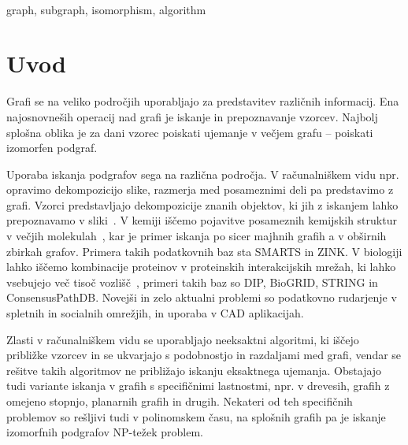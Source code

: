 \documentclass[a4paper, 12pt, ]{book}
\newcommand{\clearemptydoublepage}{\newpage{\pagestyle{empty}\cleardoublepage}}
\begin{document}
	\vspace{2cm}
	\\
	graph, subgraph, isomorphism, algorithm
	
	\clearemptydoublepage




\mainmatter
\setcounter{page}{1}
\pagestyle{fancy}



\chapter{Uvod}
Grafi se na veliko področjih uporabljajo za predstavitev različnih informacij. Ena najosnovneših 
operacij nad grafi je iskanje in prepoznavanje vzorcev. Najbolj splošna oblika je za dani vzorec poiskati
ujemanje v večjem grafu -- poiskati izomorfen podgraf. 

Uporaba iskanja podgrafov sega na različna področja. V računalniškem vidu npr. opravimo 
dekompozicijo slike, razmerja med posameznimi deli pa predstavimo z grafi. Vzorci predstavljajo
dekompozicije znanih objektov, ki jih z iskanjem lahko prepoznavamo v sliki~\cite{vf2}. V kemiji iščemo
pojavitve posameznih kemijskih struktur v večjih molekulah~\cite{chem}, kar je primer iskanja po sicer
majhnih grafih a v obširnih zbirkah grafov. Primera takih podatkovnih baz sta SMARTS in ZINK. V
biologiji lahko iščemo kombinacije proteinov v proteinskih interakcijskih mrežah, ki lahko vsebujejo več
tisoč vozlišč~\cite{subsea}, primeri takih baz so DIP, BioGRID, STRING in ConsensusPathDB. Novejši
in zelo aktualni problemi so podatkovno rudarjenje v spletnih in socialnih omrežjih, in uporaba v CAD
aplikacijah.

Zlasti v računalniškem vidu se uporabljajo neeksaktni algoritmi, ki iščejo približke vzorcev in se ukvarjajo
s podobnostjo in razdaljami med grafi, vendar se rešitve takih algoritmov ne približajo iskanju
eksaktnega ujemanja. Obstajajo tudi variante iskanja v grafih s specifičnimi lastnostmi, npr. v drevesih,
grafih z omejeno stopnjo, planarnih grafih in drugih. Nekateri od teh specifičnih problemov so rešljivi 
tudi v polinomskem času, na splošnih grafih pa je iskanje izomorfnih podgrafov NP-težek problem. 
\end{document}
